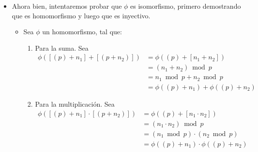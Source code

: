 \begin{problema}[Problema 3]
\begin{itemize}
\begin{dem}
\begin{itemize}
\begin{itemize}
                    \end{itemize}
                    \item Ahora bien, intentaremos probar que $\phi$ es isomorfismo, primero demostrando que es homomorfismo y luego que es inyectivo. 
                        \begin{itemize}
                            \item Sea $\phi$ un homomorfismo, tal que: 
                            \begin{enumerate}
                                \item Para la suma. Sea 
                                \begin{align*}
                                    \phi([(p)+n_1]+[(p+n_2)]) &= \phi((p)+[n_1+n_2])\\
                                    &= (n_1+n_2) \bmod p\\
                                    &= n_1 \bmod p+n_2\bmod p\\
                                    &= \phi((p)+n_1) +\phi((p)+n_2)
                                \end{align*}
                                \item Para la multiplicación. Sea 
                                \begin{align*}
                                    \phi([(p)+n_1]\cdot[(p+n_2)]) &= \phi((p)+[n_1\cdot n_2])\\
                                    &= (n_1\cdot n_2) \bmod p\\
                                    &= (n_1 \bmod p)\cdot (n_2\bmod p)\\
                                    &= \phi((p)+n_1)\cdot \phi((p)+n_2)
                                \end{align*} 
                                

\end{enumerate}
\end{itemize}
\end{itemize}
\end{dem}
\end{itemize}
\end{problema}
